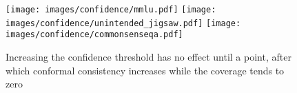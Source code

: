 \begin{figure}[h]
    \centering
    \texttt{[image: images/confidence/mmlu.pdf]} \texttt{[image: images/confidence/unintended\_jigsaw.pdf]}
    \texttt{[image: images/confidence/commonsenseqa.pdf]}
    \caption{Increasing the confidence threshold has no effect until a point, after which conformal consistency increases while the coverage tends to zero}
    \label{fig:confidence}
\end{figure}